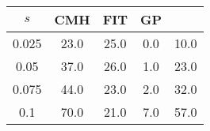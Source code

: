 \centering \begin{tabular}{c|c|c|c|c}
$s$	&CMH	&FIT	&GP	&\sc{Clear}\\\hline
0.025	&23.0	&25.0	&0.0	&10.0\\
0.05	&37.0	&26.0	&1.0	&23.0\\
0.075	&44.0	&23.0	&2.0	&32.0\\
0.1	&70.0	&21.0	&7.0	&57.0\\
\end{tabular}
